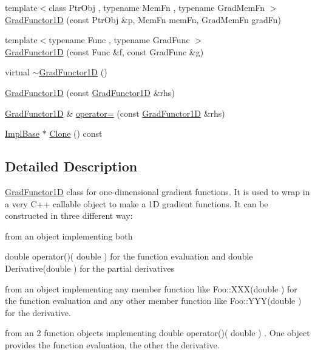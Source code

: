 \begin{DoxyCompactItemize}
\item 
{\footnotesize template$<$class Ptr\+Obj , typename Mem\+Fn , typename Grad\+Mem\+Fn $>$ }\\\mbox{\hyperlink{classROOT_1_1Math_1_1GradFunctor1D_a651aeef91a3d1a3ae323969d7239ebb2}{Grad\+Functor1D}} (const Ptr\+Obj \&p, Mem\+Fn mem\+Fn, Grad\+Mem\+Fn grad\+Fn)
\item 
{\footnotesize template$<$typename Func , typename Grad\+Func $>$ }\\\mbox{\hyperlink{classROOT_1_1Math_1_1GradFunctor1D_a30baab2a961d896e4aab6e60ed30d260}{Grad\+Functor1D}} (const Func \&f, const Grad\+Func \&g)
\item 
virtual \mbox{\hyperlink{classROOT_1_1Math_1_1GradFunctor1D_ac711d3cc551b961aa16ecdcbf50308d6}{$\sim$\+Grad\+Functor1D}} ()
\item 
\mbox{\hyperlink{classROOT_1_1Math_1_1GradFunctor1D_af43388b384674d1e811cfbc1ad562816}{Grad\+Functor1D}} (const \mbox{\hyperlink{classROOT_1_1Math_1_1GradFunctor1D}{Grad\+Functor1D}} \&rhs)
\item 
\mbox{\hyperlink{classROOT_1_1Math_1_1GradFunctor1D}{Grad\+Functor1D}} \& \mbox{\hyperlink{classROOT_1_1Math_1_1GradFunctor1D_a3ea006d92100ba76a6fae9f57499c60d}{operator=}} (const \mbox{\hyperlink{classROOT_1_1Math_1_1GradFunctor1D}{Grad\+Functor1D}} \&rhs)
\item 
\mbox{\hyperlink{classROOT_1_1Math_1_1GradFunctor1D_a16b436a0d100aa6c16ee66961c4f5b97}{Impl\+Base}} $\ast$ \mbox{\hyperlink{classROOT_1_1Math_1_1GradFunctor1D_ab8280aaf240a374fb7a67808d858af79}{Clone}} () const
\end{DoxyCompactItemize}


\subsection{Detailed Description}
\mbox{\hyperlink{classROOT_1_1Math_1_1GradFunctor1D}{Grad\+Functor1D}} class for one-\/dimensional gradient functions. It is used to wrap in a very C++ callable object to make a 1D gradient functions. It can be constructed in three different way\+: 
\begin{DoxyEnumerate}
\item from an object implementing both

double operator()( double  ) for the function evaluation and double Derivative(double ) for the partial derivatives 
\item from an object implementing any member function like Foo\+::\+X\+X\+X(double ) for the function evaluation and any other member function like Foo\+::\+Y\+Y\+Y(double ) for the derivative. 
\item from an 2 function objects implementing double operator()( double ) . One object provides the function evaluation, the other the derivative. 
\end{DoxyEnumerate}

